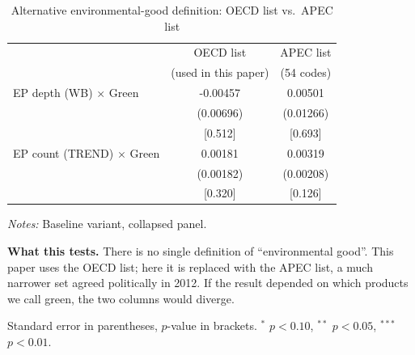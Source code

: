 \begin{table}[htbp]
\centering
\footnotesize
\caption{Alternative environmental-good definition: OECD list vs.\ APEC list}
\label{tab:apec}
\begin{threeparttable}
\begin{tabular}{lcc}
\toprule
 & OECD list & APEC list \\
 & (used in this paper) & (54 codes) \\
\midrule
EP depth (WB) $\times$ Green & -0.00457 & 0.00501 \\
 & (0.00696) & (0.01266) \\
 & [0.512] & [0.693] \\
\addlinespace
EP count (TREND) $\times$ Green & 0.00181 & 0.00319 \\
 & (0.00182) & (0.00208) \\
 & [0.320] & [0.126] \\
\bottomrule
\end{tabular}
\begin{tablenotes}[flushleft]\footnotesize
\item \emph{Notes:} Baseline variant, collapsed panel.
\item \textbf{What this tests.} There is no single definition of ``environmental good''. This paper uses the OECD list; here it is replaced with the APEC list, a much narrower set agreed politically in 2012. If the result depended on which products we call green, the two columns would diverge.
\item Standard error in parentheses, $p$-value in brackets. $^{*}$ $p<0.10$, $^{**}$ $p<0.05$, $^{***}$ $p<0.01$.
\end{tablenotes}
\end{threeparttable}
\end{table}
